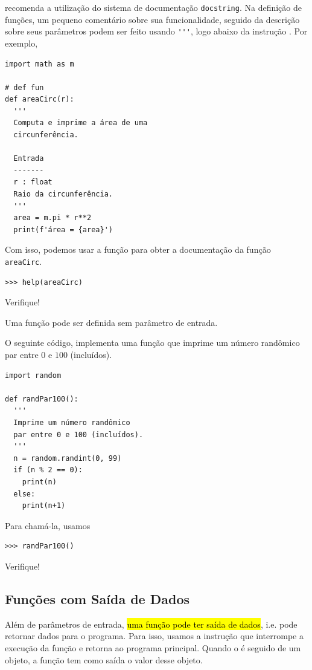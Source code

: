 \begin{obs}
  {\python} recomenda a utilização do sistema de documentação \lstinline+docstring+. Na definição de funções, um pequeno comentário sobre sua funcionalidade, seguido da descrição sobre seus parâmetros podem ser feito usando \lstinline+'''+, logo abaixo da instrução {\PYTHONdef}. Por exemplo,

\begin{lstlisting}
import math as m

# def fun
def areaCirc(r):
  '''
  Computa e imprime a área de uma
  circunferência.

  Entrada
  -------
  r : float
  Raio da circunferência.
  '''
  area = m.pi * r**2
  print(f'área = {area}')
\end{lstlisting}

Com isso, podemos usar a função {\PYTHONhelp} para obter a documentação da função \lstinline+areaCirc+.

\begin{lstlisting}
>>> help(areaCirc)
\end{lstlisting}

Verifique!
\end{obs}

Uma função pode ser definida sem parâmetro de entrada.

\begin{ex}
  O seguinte código, implementa uma função que imprime um número randômico par entre $0$ e $100$ (incluídos).

\begin{lstlisting}
import random

def randPar100():
  '''
  Imprime um número randômico
  par entre 0 e 100 (incluídos).
  '''
  n = random.randint(0, 99)
  if (n % 2 == 0):
    print(n)
  else:
    print(n+1)
\end{lstlisting}

Para chamá-la, usamos

\begin{lstlisting}
>>> randPar100()
\end{lstlisting}

Verifique!
\end{ex}

\subsection{Funções com Saída de Dados}

Além de parâmetros de entrada, \hl{uma função pode ter saída de dados}, i.e. pode retornar dados para o programa. Para isso, usamos a instrução {\PYTHONreturn} que interrompe a execução da função e retorna ao programa principal. Quando o {\PYTHONreturn} é seguido de um objeto, a função tem como saída o valor desse objeto.

